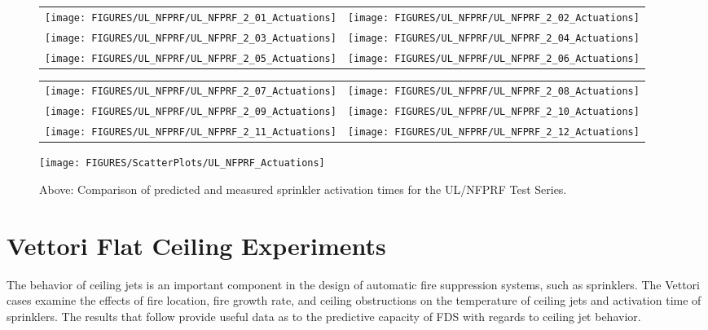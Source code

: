 \begin{figure}[p]
\begin{tabular*}{\textwidth}{l@{\extracolsep{\fill}}r}
\texttt{[image: FIGURES/UL\_NFPRF/UL\_NFPRF\_2\_01\_Actuations]} &
\texttt{[image: FIGURES/UL\_NFPRF/UL\_NFPRF\_2\_02\_Actuations]} \\
\texttt{[image: FIGURES/UL\_NFPRF/UL\_NFPRF\_2\_03\_Actuations]} &
\texttt{[image: FIGURES/UL\_NFPRF/UL\_NFPRF\_2\_04\_Actuations]} \\
\texttt{[image: FIGURES/UL\_NFPRF/UL\_NFPRF\_2\_05\_Actuations]} &
\texttt{[image: FIGURES/UL\_NFPRF/UL\_NFPRF\_2\_06\_Actuations]}
\end{tabular*}
\label{UL_NFPRF_2_1}
\end{figure}

\begin{figure}[p]
\begin{tabular*}{\textwidth}{l@{\extracolsep{\fill}}r}
\texttt{[image: FIGURES/UL\_NFPRF/UL\_NFPRF\_2\_07\_Actuations]} &
\texttt{[image: FIGURES/UL\_NFPRF/UL\_NFPRF\_2\_08\_Actuations]} \\
\texttt{[image: FIGURES/UL\_NFPRF/UL\_NFPRF\_2\_09\_Actuations]} &
\texttt{[image: FIGURES/UL\_NFPRF/UL\_NFPRF\_2\_10\_Actuations]} \\
\texttt{[image: FIGURES/UL\_NFPRF/UL\_NFPRF\_2\_11\_Actuations]} &
\texttt{[image: FIGURES/UL\_NFPRF/UL\_NFPRF\_2\_12\_Actuations]}
\end{tabular*}
\label{UL_NFPRF_2_2}
\end{figure}

\begin{figure}[p]
\begin{center}
\texttt{[image: FIGURES/ScatterPlots/UL\_NFPRF\_Actuations]}
\end{center}
\caption[Summary of sprinkler actuation predictions, UL/NFPRF Tests.]
{Above: Comparison of predicted and measured sprinkler activation times for the UL/NFPRF Test Series.}
\label{UL_NFPRF}
\end{figure}


\clearpage

\section{Vettori Flat Ceiling Experiments}
\label{Vettori_Flat_Results}

The behavior of ceiling jets is an important component in the design of automatic fire suppression systems, such as sprinklers. The Vettori cases examine the effects of fire location, fire growth rate, and ceiling obstructions on the temperature of ceiling jets and activation time of sprinklers. The results that follow provide useful data as to the predictive capacity of FDS with regards to ceiling jet behavior.

